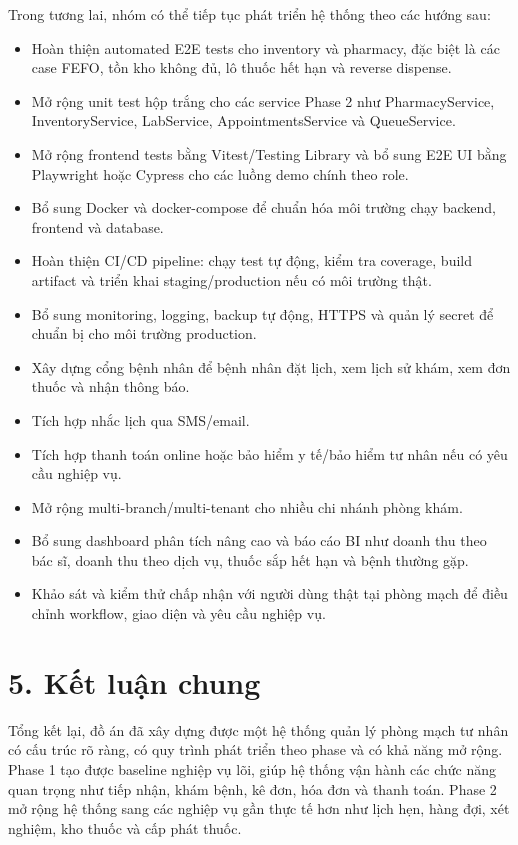 Trong tương lai, nhóm có thể tiếp tục phát triển hệ thống theo các hướng sau:

\begin{itemize}
    \item Hoàn thiện automated E2E tests cho inventory và pharmacy, đặc biệt là các case FEFO, tồn kho không đủ, lô thuốc hết hạn và reverse dispense.
    \item Mở rộng unit test hộp trắng cho các service Phase 2 như PharmacyService, InventoryService, LabService, AppointmentsService và QueueService.
    \item Mở rộng frontend tests bằng Vitest/Testing Library và bổ sung E2E UI bằng Playwright hoặc Cypress cho các luồng demo chính theo role.
    \item Bổ sung Docker và docker-compose để chuẩn hóa môi trường chạy backend, frontend và database.
    \item Hoàn thiện CI/CD pipeline: chạy test tự động, kiểm tra coverage, build artifact và triển khai staging/production nếu có môi trường thật.
    \item Bổ sung monitoring, logging, backup tự động, HTTPS và quản lý secret để chuẩn bị cho môi trường production.
    \item Xây dựng cổng bệnh nhân để bệnh nhân đặt lịch, xem lịch sử khám, xem đơn thuốc và nhận thông báo.
    \item Tích hợp nhắc lịch qua SMS/email.
    \item Tích hợp thanh toán online hoặc bảo hiểm y tế/bảo hiểm tư nhân nếu có yêu cầu nghiệp vụ.
    \item Mở rộng multi-branch/multi-tenant cho nhiều chi nhánh phòng khám.
    \item Bổ sung dashboard phân tích nâng cao và báo cáo BI như doanh thu theo bác sĩ, doanh thu theo dịch vụ, thuốc sắp hết hạn và bệnh thường gặp.
    \item Khảo sát và kiểm thử chấp nhận với người dùng thật tại phòng mạch để điều chỉnh workflow, giao diện và yêu cầu nghiệp vụ.
\end{itemize}

\section*{5. Kết luận chung}

Tổng kết lại, đồ án đã xây dựng được một hệ thống quản lý phòng mạch tư nhân có cấu trúc rõ ràng, có quy trình phát triển theo phase và có khả năng mở rộng. Phase 1 tạo được baseline nghiệp vụ lõi, giúp hệ thống vận hành các chức năng quan trọng như tiếp nhận, khám bệnh, kê đơn, hóa đơn và thanh toán. Phase 2 mở rộng hệ thống sang các nghiệp vụ gần thực tế hơn như lịch hẹn, hàng đợi, xét nghiệm, kho thuốc và cấp phát thuốc.

